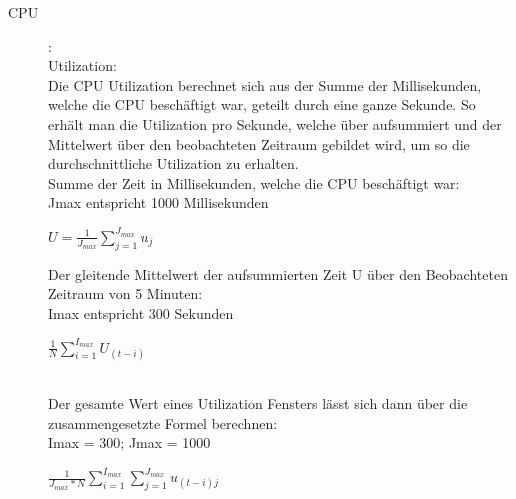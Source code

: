 \documentclass[a4paper,10pt]{scrartcl}
\begin{document}
\begin{description}
\item[CPU]:\\
Utilization:\\
Die CPU Utilization berechnet sich aus der Summe der Millisekunden, welche die CPU beschäftigt war, geteilt durch eine ganze Sekunde. So erhält man die Utilization pro Sekunde, welche über aufsummiert und der Mittelwert über den beobachteten Zeitraum gebildet wird, um so die durchschnittliche Utilization zu erhalten.\\

Summe der Zeit in Millisekunden, welche die CPU beschäftigt war:\\

Jmax entspricht 1000 Millisekunden

\begin{Huge}

\(U =  \frac{1}{J_{max}}{\sum\limits_{j=1}^{J_{max}} u_{j}} \)

\end{Huge}

Der gleitende Mittelwert der aufsummierten Zeit U über den Beobachteten Zeitraum von 5 Minuten:\\
Imax entspricht 300 Sekunden

\begin{Huge}
\(
\displaystyle{\frac{1}{N}{\sum\limits_{i=1}^{I_{max}} U_{(t-i)}} }
\) 
\end{Huge}\\
Der gesamte Wert eines Utilization Fensters lässt sich dann über die zusammengesetzte Formel berechnen:\\

Imax = 300; Jmax = 1000

\begin{Huge}
\(
\displaystyle{
{\frac{1}{J_{max}*N}\sum\limits_{i=1}^{I_{max}} \sum\limits_{j=1}^{J_{max}} u_{{(t-i)j}}}
  }\)
\end{Huge}\\


\end{description}
\end{document}
